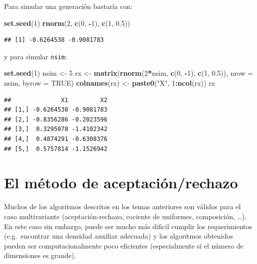 \documentclass[]{book}
\newenvironment{Shaded}{\begin{snugshade}}{\end{snugshade}}
\newcommand{\KeywordTok}[1]{\textcolor[rgb]{0.13,0.29,0.53}{\textbf{#1}}}
\newcommand{\DataTypeTok}[1]{\textcolor[rgb]{0.13,0.29,0.53}{#1}}
\newcommand{\DecValTok}[1]{\textcolor[rgb]{0.00,0.00,0.81}{#1}}
\newcommand{\FloatTok}[1]{\textcolor[rgb]{0.00,0.00,0.81}{#1}}
\newcommand{\StringTok}[1]{\textcolor[rgb]{0.31,0.60,0.02}{#1}}
\newcommand{\OtherTok}[1]{\textcolor[rgb]{0.56,0.35,0.01}{#1}}
\newcommand{\OperatorTok}[1]{\textcolor[rgb]{0.81,0.36,0.00}{\textbf{#1}}}
\newcommand{\NormalTok}[1]{#1}
\theoremstyle{definition}
\theoremstyle{definition}
\theoremstyle{definition}
\theoremstyle{remark}
\begin{document}
Para simular una generación bastaría con:

\begin{Shaded}
\begin{Highlighting}[]
\KeywordTok{set.seed}\NormalTok{(}\DecValTok{1}\NormalTok{)}
\KeywordTok{rnorm}\NormalTok{(}\DecValTok{2}\NormalTok{, }\KeywordTok{c}\NormalTok{(}\DecValTok{0}\NormalTok{, }\OperatorTok{-}\DecValTok{1}\NormalTok{), }\KeywordTok{c}\NormalTok{(}\DecValTok{1}\NormalTok{, }\FloatTok{0.5}\NormalTok{))}
\end{Highlighting}
\end{Shaded}

\begin{verbatim}
## [1] -0.6264538 -0.9081783
\end{verbatim}

y para simular \texttt{nsim}:

\begin{Shaded}
\begin{Highlighting}[]
\KeywordTok{set.seed}\NormalTok{(}\DecValTok{1}\NormalTok{)}
\NormalTok{nsim <-}\StringTok{ }\DecValTok{5}
\NormalTok{rx <-}\StringTok{ }\KeywordTok{matrix}\NormalTok{(}\KeywordTok{rnorm}\NormalTok{(}\DecValTok{2}\OperatorTok{*}\NormalTok{nsim, }\KeywordTok{c}\NormalTok{(}\DecValTok{0}\NormalTok{, }\OperatorTok{-}\DecValTok{1}\NormalTok{), }\KeywordTok{c}\NormalTok{(}\DecValTok{1}\NormalTok{, }\FloatTok{0.5}\NormalTok{)), }\DataTypeTok{nrow =}\NormalTok{ nsim, }\DataTypeTok{byrow =} \OtherTok{TRUE}\NormalTok{)}
\KeywordTok{colnames}\NormalTok{(rx) <-}\StringTok{ }\KeywordTok{paste0}\NormalTok{(}\StringTok{"X"}\NormalTok{, }\DecValTok{1}\OperatorTok{:}\KeywordTok{ncol}\NormalTok{(rx))}
\NormalTok{rx}
\end{Highlighting}
\end{Shaded}

\begin{verbatim}
##              X1         X2
## [1,] -0.6264538 -0.9081783
## [2,] -0.8356286 -0.2023596
## [3,]  0.3295078 -1.4102342
## [4,]  0.4874291 -0.6308376
## [5,]  0.5757814 -1.1526942
\end{verbatim}

\section{El método de
aceptación/rechazo}\label{el-metodo-de-aceptacionrechazo}

Muchos de los algoritmos descritos en los temas anteriores son válidos
para el caso multivariante (aceptación-rechazo, cociente de uniformes,
composición, \ldots{}). En este caso sin embargo, puede ser mucho más
dificil cumplir los requerimientos (e.g.~encontrar una densidad auxiliar
adecuada) y los algoritmos obtenidos pueden ser computacionalmente poco
eficientes (especialmente si el número de dimensiones es grande).
\end{document}
